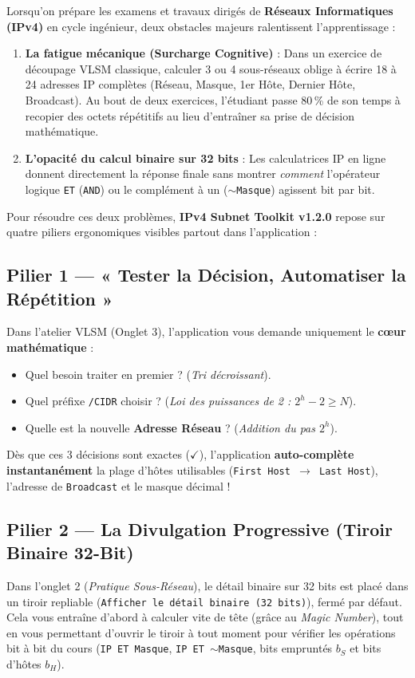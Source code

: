 \documentclass[11pt,a4paper]{article}
\begin{document}
Lorsqu'on prépare les examens et travaux dirigés de \textbf{Réseaux Informatiques (IPv4)} en cycle ingénieur, deux obstacles majeurs ralentissent l'apprentissage :
\begin{enumerate}
    \item \textbf{La fatigue mécanique (Surcharge Cognitive)} : Dans un exercice de découpage VLSM classique, calculer 3 ou 4 sous-réseaux oblige à écrire 18 à 24 adresses IP complètes (Réseau, Masque, 1er Hôte, Dernier Hôte, Broadcast). Au bout de deux exercices, l'étudiant passe 80\,\% de son temps à recopier des octets répétitifs au lieu d'entraîner sa prise de décision mathématique.
    \item \textbf{L'opacité du calcul binaire sur 32 bits} : Les calculatrices IP en ligne donnent directement la réponse finale sans montrer \textit{comment} l'opérateur logique \texttt{ET} (\texttt{AND}) ou le complément à un (\texttt{$\sim$Masque}) agissent bit par bit.
\end{enumerate}

Pour résoudre ces deux problèmes, \textbf{IPv4 Subnet Toolkit v1.2.0} repose sur quatre piliers ergonomiques visibles partout dans l'application :

\subsection{Pilier 1 — « Tester la Décision, Automatiser la Répétition »}
Dans l'atelier VLSM (Onglet 3), l'application vous demande uniquement le \textbf{cœur mathématique} :
\begin{itemize}
    \item Quel besoin traiter en premier ? (\textit{Tri décroissant}).
    \item Quel préfixe \texttt{/CIDR} choisir ? (\textit{Loi des puissances de 2 : $2^h - 2 \ge N$}).
    \item Quelle est la nouvelle \textbf{Adresse Réseau} ? (\textit{Addition du pas $2^h$}).
\end{itemize}
Dès que ces 3 décisions sont exactes ($\checkmark$), l'application \textbf{auto-complète instantanément} la plage d'hôtes utilisables (\texttt{First Host $\to$ Last Host}), l'adresse de \texttt{Broadcast} et le masque décimal !

\subsection{Pilier 2 — La Divulgation Progressive (Tiroir Binaire 32-Bit)}
Dans l'onglet 2 (\textit{Pratique Sous-Réseau}), le détail binaire sur 32 bits est placé dans un tiroir repliable (\texttt{Afficher le détail binaire (32 bits)}), fermé par défaut. Cela vous entraîne d'abord à calculer vite de tête (grâce au \textit{Magic Number}), tout en vous permettant d'ouvrir le tiroir à tout moment pour vérifier les opérations bit à bit du cours (\texttt{IP ET Masque}, \texttt{IP ET $\sim$Masque}, bits empruntés $b_S$ et bits d'hôtes $b_H$).
\end{document}
